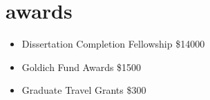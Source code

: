 \section{awards}
\begin{itemize}
\item Dissertation Completion Fellowship \textendash \$14000
\item Goldich Fund Awards \textendash \$1500
\item Graduate Travel Grants \textendash \$300
\end{itemize}
